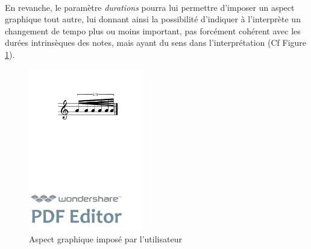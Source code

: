 \documentclass[a4paper,10pt,twocolumn]{article}
\newenvironment{code}
  {\fontfamily{pnc}\selectfont}{}
\begin{document}
\paragraph{}
En revanche, le paramètre \textit{durations} pourra lui permettre d'imposer un aspect graphique tout autre, lui donnant ainsi la possibilité d'indiquer à l'interprète un changement de tempo plus ou moins important, pas forcément cohérent avec les durées intrinsèques des notes, mais ayant du sens dans l'interprétation (Cf Figure \ref{fig:utilisateur}).

\begin{figure}[h]
\centering
\begin{code}
[ \textbackslash{}fBeam\textless{}durations="1/16,1/64", drawDuration="true"\textgreater{}(a/8 a/16 a a a/32 a) ]
\end{code}

\includegraphics[width=5cm]{img/durations.pdf}
\caption{Aspect graphique imposé par l'utilisateur}
\label{fig:utilisateur}
\end{figure}
\end{document}

